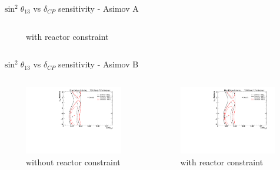 \documentclass{beamer}
\newcommand{\deltacp}{$\delta_{CP}$\xspace}
\newcommand{\sinsqthetaonethree}{$\sin^2\theta_{13}$\xspace}
\begin{document}
\begin{frame}{\sinsqthetaonethree vs \deltacp sensitivity - Asimov A}
\begin{columns}
\begin{column}{0.5\paperwidth}
\begin{figure}
				\caption*{with reactor constraint}
			\end{figure}
		\end{column}
	\end{columns}
\end{frame}

\begin{frame}{\sinsqthetaonethree vs \deltacp sensitivity - Asimov B}
	\centering
	\begin{columns}
		\begin{column}{0.5\paperwidth}
			\begin{figure}
				\includegraphics[trim={0cm 0cm 0cm 0cm}, clip, scale=0.33] {images/sensitivity/th13_dcp_global_t2k}
				\caption*{without reactor constraint}
			\end{figure}
		\end{column}
		\begin{column}{0.5\paperwidth}
			\begin{figure}
				\includegraphics[trim={0cm 0cm 0cm 0cm}, clip, scale=0.33] {images/sensitivity/th13_dcp_global_t2k}
				\caption*{with reactor constraint}
			\end{figure}
		\end{column}
	\end{columns}
\end{frame}
\end{document}
